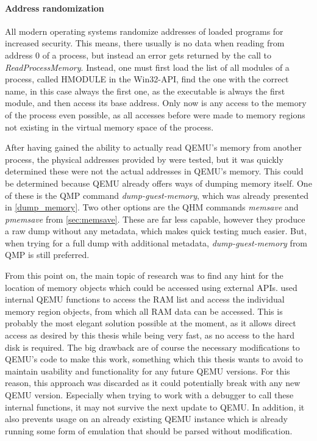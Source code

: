 \paragraph{Address randomization}
All modern operating systems randomize addresses of loaded programs for increased security.
This means, there usually is no data when reading from address 0 of a process,
but instead an error gets returned by the call to \emph{ReadProcessMemory}.
Instead, one must first load the list of all modules of a process,
called HMODULE in the Win32-API, find the one with the correct name,
in this case always the first one, as the executable is always the first module,
and then access its base address.
Only now is any access to the memory of the process even possible,
as all accesses before were made to memory regions
not existing in the virtual memory space of the process.

After having gained the ability to actually read QEMU's memory from another process,
the physical addresses provided by  were tested,
but it was quickly determined these were not the actual addresses in QEMU's memory.
This could be determined because QEMU already offers ways of dumping memory itself.
One of these is the QMP command \emph{dump-guest-memory},
which was already presented in \autoref{dump_memory}.
Two other options are the QHM commands \emph{memsave} and \emph{pmemsave} from \autoref{sec:memsave}.
These are far less capable, however they produce a raw dump without any metadata,
which makes quick testing much easier.
But, when trying for a full dump with additional metadata,
\emph{dump-guest-memory} from QMP is still preferred.

From this point on, the main topic of research was to find any hint for the location of memory objects
which could be accessed using external APIs.
 used internal QEMU functions to access the RAM list
and access the individual memory region objects,
from which all RAM data can be accessed\cite{kitcheckpoints}.
This is probably the most elegant solution possible at the moment,
as it allows direct access as desired by this thesis
while being very fast, as no access to the hard disk is required.
The big drawback are of course the necessary modifications to QEMU's code to make this work,
something which this thesis wants to avoid to maintain usability and functionality for any future QEMU versions.
For this reason, this approach was discarded as it could potentially break with any new QEMU version.
Especially when trying to work with a debugger to call these internal functions,
it may not survive the next update to QEMU.
In addition, it also prevents usage on an already existing QEMU instance
which is already running some form of emulation that should be parsed without modification.

